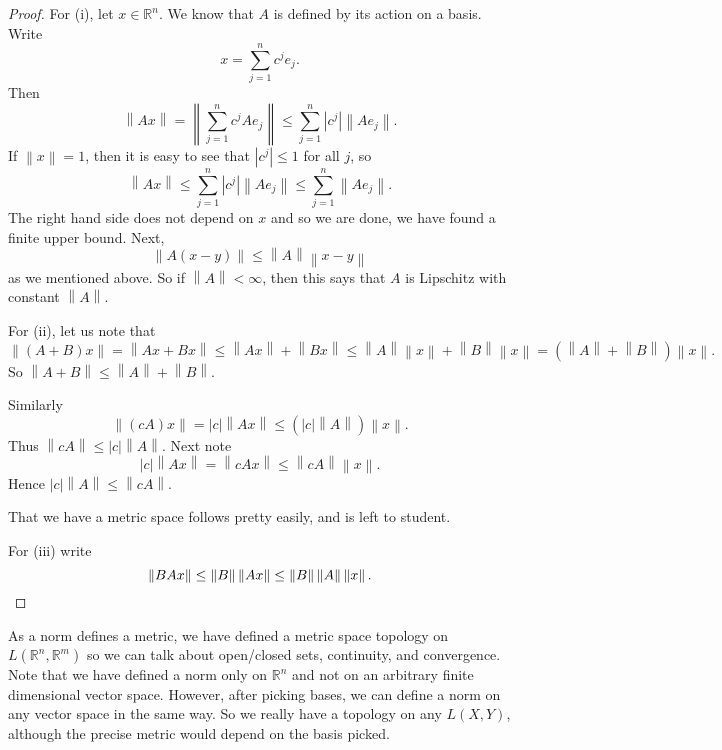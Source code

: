 \documentclass[12pt]{book}
\newcommand{\abs}[1]{\left\lvert {#1} \right\rvert}
\newcommand{\norm}[1]{\left\lVert {#1} \right\rVert}
\newcommand{\R}{{\mathbb{R}}}
\theoremstyle{plain}
\theoremstyle{remark}
\theoremstyle{definition}
\theoremstyle{exercise}
\theoremstyle{example}
\begin{document}
\begin{proof}
For (i), let $x \in \R^n$.  We know that $A$ is defined by its action on a
basis.  Write
\begin{equation*}
x = \sum_{j=1}^n c^j e_j .
\end{equation*}
Then
\begin{equation*}
\norm{Ax} =
\norm{\sum_{j=1}^n c^j Ae_j}
\leq
\sum_{j=1}^n \abs{c^j} \norm{Ae_j} .
\end{equation*}
If $\norm{x} = 1$, then it is easy to see that $\abs{c^j} \leq 1$ for
all $j$, so
\begin{equation*}
\norm{Ax}
\leq
\sum_{j=1}^n \abs{c^j} \norm{Ae_j} 
\leq
\sum_{j=1}^n \norm{Ae_j} .
\end{equation*}
The right hand side does not depend on $x$ and so we are done, we have found
a finite upper bound.  Next,
\begin{equation*}
\norm{A(x-y)} \leq \norm{A} \norm{x-y}
\end{equation*}
as we mentioned above.  So if $\norm{A} < \infty$, then this says that
$A$ is Lipschitz with constant $\norm{A}$.

For (ii), let us note that
\begin{equation*}
\norm{(A+B)x} =
\norm{Ax+Bx} \leq
\norm{Ax}+\norm{Bx} \leq
\norm{A} \norm{x}+\norm{B}\norm{x} =
(\norm{A}+\norm{B}) \norm{x} .
\end{equation*}
So $\norm{A+B} \leq \norm{A}+\norm{B}$.

Similarly
\begin{equation*}
\norm{(cA)x} =
\abs{c} \norm{Ax} \leq (\abs{c}\norm{A}) \norm{x} .
\end{equation*}
Thus $\norm{cA} \leq \abs{c}\norm{A}$.  Next note 
\begin{equation*}
\abs{c} \norm{Ax}
=
\norm{cAx} \leq \norm{cA} \norm{x} .
\end{equation*}
Hence $\abs{c}\norm{A} \leq \norm{cA}$.

That we have a metric space follows pretty easily, and is left to student.

For (iii) write
\begin{equation*}
\norm{BAx} \leq \norm{B} \norm{Ax} \leq \norm{B} \norm{A} \norm{x} .
\qedhere
\end{equation*}
\end{proof}

As a norm defines a metric,
we have defined a metric space topology on $L(\R^n,\R^m)$ so we can talk
about open/closed sets, continuity, and convergence.  Note that we have
defined a norm only on $\R^n$ and not on an arbitrary finite dimensional
vector space.  However, after picking bases, we can define a norm on any
vector space in the same way.  So we really have a topology on any $L(X,Y)$,
although the precise metric would depend on the basis picked.
\end{document}
